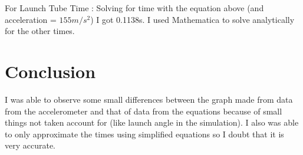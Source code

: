 \documentclass[a4paper,11pt]{article}
\begin{document}
{}

{For Launch Tube Time : Solving for time with the equation above (and acceleration = $155m/s^2$) I got 0.1138s. I used Mathematica to solve analytically for the other times.}

\section{Conclusion}
{I was able to observe some small differences between the graph made from data from the accelerometer and that of data from the equations because of small things not taken account for (like launch angle in the simulation). I also was able to only approximate the times using simplified equations so I doubt that it is very accurate. }
\end{document}
